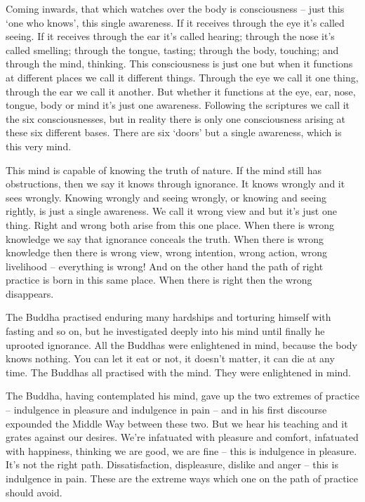 Coming inwards, that which watches over the body is consciousness -- just this `one who knows', this single awareness. If it receives through the eye it's called seeing. If it receives through the ear it's called hearing; through the nose it's called smelling; through the tongue, tasting; through the body, touching; and through the mind, thinking. This consciousness is just one but when it functions at different places we call it different things. Through the eye we call it one thing, through the ear we call it another. But whether it functions at the eye, ear, nose, tongue, body or mind it's just one awareness. Following the scriptures we call it the six consciousnesses, but in reality there is only one consciousness arising at these six different bases. There are six `doors' but a single awareness, which is this very mind.

This mind is capable of knowing the truth of nature. If the mind still has obstructions, then we say it knows through ignorance. It knows wrongly and it sees wrongly. Knowing wrongly and seeing wrongly, or knowing and seeing rightly, is just a single awareness. We call it wrong view and  but it's just one thing. Right and wrong both arise from this one place. When there is wrong knowledge we say that ignorance conceals the truth. When there is wrong knowledge then there is wrong view, wrong intention, wrong action, wrong livelihood -- everything is wrong! And on the other hand the path of right practice is born in this same place. When there is right then the wrong disappears.


The Buddha practised enduring many hardships and torturing himself with fasting and so on, but he investigated deeply into his mind until finally he uprooted ignorance. All the Buddhas were enlightened in mind, because the body knows nothing. You can let it eat or not, it doesn't matter, it can die at any time. The Buddhas all practised with the mind. They were enlightened in  mind.

The Buddha, having contemplated his mind, gave up the two extremes of practice -- indulgence in pleasure and indulgence in pain -- and in his first discourse expounded the Middle Way between these two. But we hear his teaching and it grates against our desires. We're infatuated with pleasure and comfort, infatuated with happiness, thinking we are good, we are fine -- this is indulgence in pleasure. It's not the right path. Dissatisfaction, displeasure, dislike and anger -- this is indulgence in pain. These are the extreme ways which one on the path of practice should avoid.

